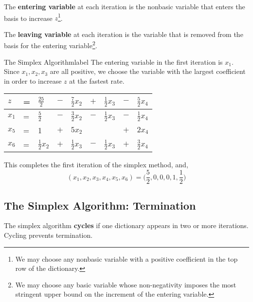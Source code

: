 	\begin{defn}
		The \textbf{entering variable} at each iteration is the nonbasic variable that enters the basis to increase $z$\footnote{We may choose any nonbasic variable with a positive coefficient in the top row of the dictionary.}. 
	\end{defn}

	\begin{defn}
		The \textbf{leaving variable} at each iteration is the variable that is removed from the basis for the entering variable\footnote{We may choose any basic variable whose non-negativity imposes the most stringent upper bound on the increment of the entering variable.}. 
	\end{defn}

	\begin{ex}{The Simplex Algorithm}{label}
		The entering variable in the first iteration is $x_1$. Since $x_1, x_2, x_3$ are all positive, we choose the variable with the largest coefficient in order to increase $z$ at the fastest rate.

		\vphantom{.}
		\begin{center}
		\begin{tabular}{lllllllll}
		$z$   & = & $\frac{25}{2}$ & $-$   & $\frac{7}{2}x_2$  & $+$ & $\frac{1}{2}x_3$  & $-$ & $\frac{5}{2}x_4$ \\ \hline
		$x_1$ & = & $\frac{5}{2}$ & $-$ & $\frac{3}{2}x_2$ & $-$ & $\frac{1}{2}x_3$ & $-$ & $\frac{1}{2}x_4$ \\
		$x_5$ & = & 1 & $+$ & $5x_2$ & & & $+$ & $2x_4$ \\
		$x_6$ & = & $\frac{1}{2}x_2$ & $+$ & $\frac{1}{2}x_3$ & $-$ & $\frac{1}{2}x_3$ & $+$ & $\frac{3}{2}x_4$
		\end{tabular}
		\end{center}
		\vphantom{.}

		This completes the first iteration of the simplex method, and,
		\[(x_1, x_2, x_3, x_4, x_5, x_6) = \bigg(\frac{5}{2},0,0,0,1,\frac{1}{2}\bigg)\]
	\end{ex}

	\subsection{The Simplex Algorithm: Termination}
	\begin{defn}[Cycling]
		The simplex algorithm \textbf{cycles} if one dictionary appears in two or more iterations. Cycling prevents termination.
	\end{defn}

